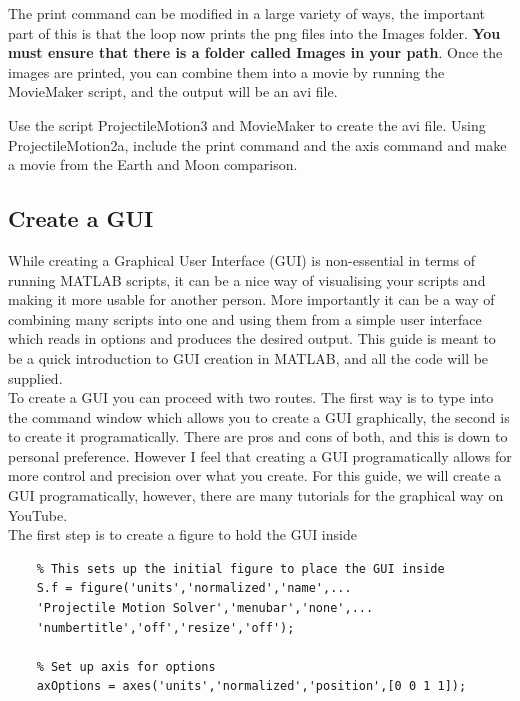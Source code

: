 \documentclass[12pt]{report}
\begin{document}
\noindent The print command can be modified in a large variety of ways, the important part of this is that the loop now prints the png files into the Images folder. \textbf{You must ensure that there is a folder called Images in your path}. Once the images are printed, you can combine them into a movie by running the MovieMaker script, and the output will be an avi file.\\

\begin{tcolorbox}[title=Task (Optional)]
Use the script ProjectileMotion3 and MovieMaker to create the avi file. Using ProjectileMotion2a, include the print command and the axis command and make a movie from the Earth and Moon comparison.
\end{tcolorbox}

\subsection*{Create a GUI}
While creating a Graphical User Interface (GUI) is non-essential in terms of running MATLAB scripts, it can be a nice way of visualising your scripts and making it more usable for another person. More importantly it can be a way of combining many scripts into one and using them from a simple user interface which reads in options and produces the desired output. This guide is meant to be a quick introduction to GUI creation in MATLAB, and all the code will be supplied.\\

\noindent To create a GUI you can proceed with two routes. The first way is to type  into the command window which allows you to create a GUI graphically, the second is to create it programatically. There are pros and cons of both, and this is down to personal preference. However I feel that creating a GUI programatically allows for more control and precision over what you create. For this guide, we will create a GUI programatically, however, there are many tutorials for the graphical way on YouTube.\\

\noindent The first step is to create a figure to hold the GUI inside
\begin{lstlisting}
    % This sets up the initial figure to place the GUI inside
    S.f = figure('units','normalized','name',...
    'Projectile Motion Solver','menubar','none',...
    'numbertitle','off','resize','off');
    
    % Set up axis for options
    axOptions = axes('units','normalized','position',[0 0 1 1]);
\end{lstlisting}
\end{document}
